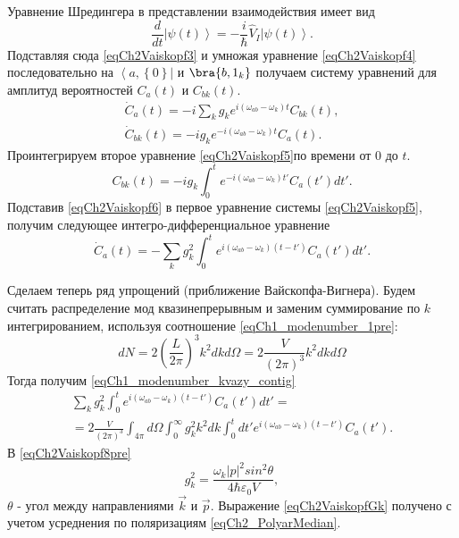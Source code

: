 Уравнение Шредингера в представлении взаимодействия имеет вид
\begin{equation}
\frac{d}{dt} \left|\psi\left(t\right)\right> =
- \frac{i}{\hbar} \hat{V}_I \left|\psi\left(t\right)\right>.
\label{eqCh2Vaiskopf4}
\end{equation}
Подставляя сюда \eqref{eqCh2Vaiskopf3} и умножая уравнение
\eqref{eqCh2Vaiskopf4} последовательно на
$\left<a, \left\{0\right\}\right|$ и $\bra{b, 1_k}$ получаем
систему уравнений для амплитуд вероятностей 
$C_{a}\left(t\right)$ и $C_{bk}\left(t\right)$.
\begin{eqnarray}
\dot{C}_{a}\left(t\right) = - i \sum_{k} g_k e^{i \left(\omega_{ab} - 
  \omega_k\right)t} C_{bk}\left(t\right),
\nonumber \\
\dot{C}_{bk}\left(t\right) = - i g_k e^{- i \left(\omega_{ab} -
  \omega_k\right)t} C_{a}\left(t\right).
\label{eqCh2Vaiskopf5}
\end{eqnarray}
Проинтегрируем второе уравнение \eqref{eqCh2Vaiskopf5}по времени от $0$ до
$t$. 
\begin{equation}
C_{bk}\left(t\right) = - i g_k \int_0^{t} e^{- i \left(\omega_{ab} -
  \omega_k\right)t'} C_{a}\left(t'\right) dt'.
\label{eqCh2Vaiskopf6}
\end{equation}
Подставив \eqref{eqCh2Vaiskopf6} в первое уравнение системы
\eqref{eqCh2Vaiskopf5}, получим следующее интегро-дифференциальное
уравнение
\begin{equation}
\dot{C}_{a}\left(t\right) = - \sum_{k} g_k^2 
\int_0^t
e^{i \left(\omega_{ab} - \omega_k\right)\left(t - t'\right)}  
C_{a}\left(t'\right) dt'.
\label{eqCh2Vaiskopf7}
\end{equation}

Сделаем теперь ряд упрощений (приближение Вайскопфа-Вигнера). Будем
считать распределение мод квазинепрерывным и заменим суммирование по
$k$ интегрированием, используя соотношение
\eqref{eqCh1_modenumber_1pre}:
\begin{equation}
d N = 2 \left(\frac{L}{2 \pi} \right)^3 k^2 d k d \Omega = 
2 \frac{V}{\left(2 \pi\right)^3}  k^2 d k d \Omega
\nonumber
\end{equation}
Тогда получим \eqref{eqCh1_modenumber_kvazy_contig}
\begin{eqnarray}
\sum_{k} g_k^2 
\int_0^t
e^{i \left(\omega_{ab} - \omega_k\right)\left(t - t'\right)}  
C_{a}\left(t'\right) dt' = 
\nonumber \\
= 2 \frac{V}{\left(2 \pi\right)^3} \int_{4\pi}d \Omega \int_0^{\infty}
g_k^2 k^2 dk  \int_0^t dt'
e^{i \left(\omega_{ab} - \omega_k\right)\left(t - t'\right)}  
C_{a}\left(t'\right).
\label{eqCh2Vaiskopf8pre}
\end{eqnarray}
В \eqref{eqCh2Vaiskopf8pre} 
\begin{equation}
g_k^2 = \frac{\omega_k\left|p\right|^2 sin^2 \theta}{4 \hbar
  \varepsilon_0 V},
\label{eqCh2VaiskopfGk}
\end{equation}
$\theta$ - угол между направлениями $\vec{k}$ и $\vec{p}$.
Выражение \eqref{eqCh2VaiskopfGk} получено с учетом усреднения по
поляризациям \eqref{eqCh2_PolyarMedian}.

